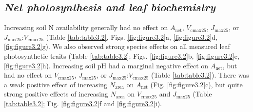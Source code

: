 \subsection{\textit{Net photosynthesis and leaf biochemistry}}
Increasing soil N availability generally had no effect on $A_\mathrm{net}$, $V_\mathrm{cmax25}$, $J_\mathrm{max25}$, or $J_\mathrm{max25}$:$V_\mathrm{cmax25}$ (Table \ref{tab:table3.2}, Figs. \ref{fig:figure3.2}a, \ref{fig:figure3.2}d, \ref{fig:figure3.2}g). We also observed strong species effects on all measured leaf photosynthetic traits (Table \ref{tab:table3.2}; Figs. \ref{fig:figure3.2}b, \ref{fig:figure3.2}e, \ref{fig:figure3.2}h). Increasing soil pH had a marginal negative effect on $A_\mathrm{net}$, but had no effect on $V_\mathrm{cmax25}$, $J_\mathrm{max25}$, or $J_\mathrm{max25}$:$V_\mathrm{cmax25}$ (Table \ref{tab:table3.2}). There was a weak positive effect of increasing $N_\mathrm{area}$ on $A_\mathrm{net}$ (Fig. \ref{fig:figure3.2}c), but quite strong positive effects of increasing $N_\mathrm{area}$ on $V_\mathrm{cmax25}$ and $J_\mathrm{max25}$ (Table \ref{tab:table3.2}; Fig. \ref{fig:figure3.2}f and \ref{fig:figure3.2}i).
\clearpage
    
